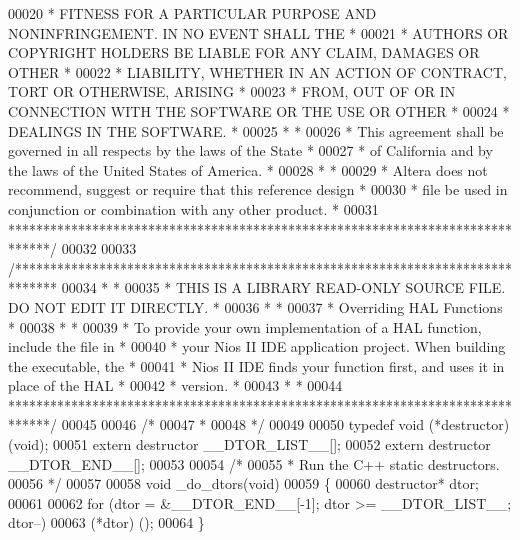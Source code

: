 \begin{DoxyCode}
00020 \textcolor{comment}{* FITNESS FOR A PARTICULAR PURPOSE AND NONINFRINGEMENT. IN NO EVENT SHALL THE *}
00021 \textcolor{comment}{* AUTHORS OR COPYRIGHT HOLDERS BE LIABLE FOR ANY CLAIM, DAMAGES OR OTHER      *}
00022 \textcolor{comment}{* LIABILITY, WHETHER IN AN ACTION OF CONTRACT, TORT OR OTHERWISE, ARISING     *}
00023 \textcolor{comment}{* FROM, OUT OF OR IN CONNECTION WITH THE SOFTWARE OR THE USE OR OTHER         *}
00024 \textcolor{comment}{* DEALINGS IN THE SOFTWARE.                                                   *}
00025 \textcolor{comment}{*                                                                             *}
00026 \textcolor{comment}{* This agreement shall be governed in all respects by the laws of the State   *}
00027 \textcolor{comment}{* of California and by the laws of the United States of America.              *}
00028 \textcolor{comment}{*                                                                             *}
00029 \textcolor{comment}{* Altera does not recommend, suggest or require that this reference design    *}
00030 \textcolor{comment}{* file be used in conjunction or combination with any other product.          *}
00031 \textcolor{comment}{******************************************************************************/}
00032 
00033 \textcolor{comment}{/******************************************************************************}
00034 \textcolor{comment}{*                                                                             *}
00035 \textcolor{comment}{* THIS IS A LIBRARY READ-ONLY SOURCE FILE. DO NOT EDIT IT DIRECTLY.           *}
00036 \textcolor{comment}{*                                                                             *}
00037 \textcolor{comment}{* Overriding HAL Functions                                                    *}
00038 \textcolor{comment}{*                                                                             *}
00039 \textcolor{comment}{* To provide your own implementation of a HAL function, include the file in   *}
00040 \textcolor{comment}{* your Nios II IDE application project. When building the executable, the     *}
00041 \textcolor{comment}{* Nios II IDE finds your function first, and uses it in place of the HAL      *}
00042 \textcolor{comment}{* version.                                                                    *}
00043 \textcolor{comment}{*                                                                             *}
00044 \textcolor{comment}{******************************************************************************/}
00045 
00046 \textcolor{comment}{/*}
00047 \textcolor{comment}{ * }
00048 \textcolor{comment}{ */}
00049 
00050 \textcolor{keyword}{typedef} void (*destructor) (void);
00051 \textcolor{keyword}{extern} destructor __DTOR_LIST__[];
00052 \textcolor{keyword}{extern} destructor __DTOR_END__[];
00053 
00054 \textcolor{comment}{/*}
00055 \textcolor{comment}{ * Run the C++ static destructors.}
00056 \textcolor{comment}{ */}
00057 
00058 \textcolor{keywordtype}{void} _do_dtors(\textcolor{keywordtype}{void})
00059 \{
00060   destructor* dtor;
00061 
00062   \textcolor{keywordflow}{for} (dtor = &__DTOR_END__[-1]; dtor >= __DTOR_LIST__; dtor--)
00063         (*dtor) (); 
00064 \}
\end{DoxyCode}
